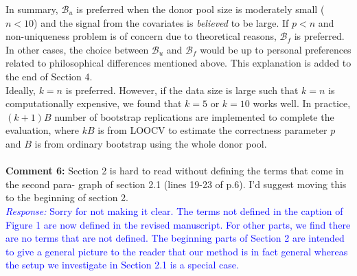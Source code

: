 \documentclass[12pt]{article}
\newcommand{\response}[1]{\noindent \textcolor{blue}{\emph{Response:} #1}}
\begin{document}
{In summary, $\mathcal{B}_u$ is preferred when  the donor pool size is moderately small ($n< 10$) and the signal from the covariates is \emph{believed} to be large. If $p < n$ and non-uniqueness problem is of concern due to theoretical reasons,  $\mathcal{B}_f$ is preferred. In other cases, the choice between  $\mathcal{B}_u$  and  $\mathcal{B}_f$ would be up to personal preferences related to philosophical differences mentioned above. This explanation is added to the end of Section 4.  \\

Ideally, $k=n$ is preferred. However, if the data size is large such that $k=n$ is computationally expensive, we found that $k = 5$ or $k = 10$ works well. In practice, $(k+1) B$ number of bootstrap replications are implemented to complete the evaluation, where $k B$ is from LOOCV to estimate the correctness parameter $p$ and $B$ is from ordinary bootstrap using the whole donor pool. \\

} \\

{\bf Comment 6:} Section 2 is hard to read without defining the terms that come in the second para- graph of section 2.1 (lines 19-23 of p.6). I'd suggest moving this to the beginning of section 2. \\

\response{Sorry for not making it clear. The terms not defined in the caption of Figure 1 are now defined in the revised manuscript. For other parts, we find there are no terms that are not defined. The beginning parts of Section 2 are intended to give a general picture to the reader that our method is in fact general whereas the setup we investigate in Section 2.1 is a special case. }


\end{document}
